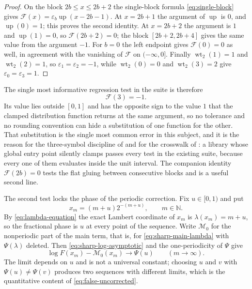 \documentclass[11pt,oneside]{article}
\theoremstyle{definition}
\theoremstyle{remark}
\newcommand{\N}{\mathbb N}
\newcommand{\Up}{\operatorname{up}}
\newcommand{\wt}{\operatorname{wt}_2}
\begin{document}
\begin{proof}
On the block $2b\le x\le2b+2$ the single-block formula \eqref{eq:single-block} gives
$\mathcal F(x)=\varepsilon_{b}\Up(x-2b-1)$.  At $x=2b+1$ the argument of $\Up$ is $0$, and
$\Up(0)=1$; this proves the second identity.  At $x=2b+2$ the argument is $1$ and
$\Up(1)=0$, so $\mathcal F(2b+2)=0$; the block $[2b+2,2b+4]$ gives the same value from the
argument $-1$.  For $b=0$ the left endpoint gives $\mathcal F(0)=0$ as well, in agreement
with the vanishing of $\mathcal F$ on $(-\infty,0]$.  Finally $\wt(1)=1$ and $\wt(2)=1$, so
$\varepsilon_{1}=\varepsilon_{2}=-1$, while $\wt(0)=0$ and $\wt(3)=2$ give
$\varepsilon_{0}=\varepsilon_{3}=1$.
\end{proof}

The single most informative regression test in the suite is therefore
\begin{equation}
 \mathcal F(3)=-1.                                        \label{eq:aud-test-global}
\end{equation}
Its value lies outside $[0,1]$ and has the opposite sign to the value $1$ that the clamped
distribution function returns at the same argument, so no tolerance and no rounding
convention can hide a substitution of one function for the other.  That substitution is the
single most common error in this subject, and it is the reason for the three-symbol
discipline of  and for the crosswalk of : a
library whose global entry point silently clamps passes every test in the existing suite,
because every one of them evaluates inside the unit interval.  The companion identity
$\mathcal F(2b)=0$ tests the flat gluing between consecutive blocks and is a useful second
line.

The second test locks the phase of the periodic correction.  Fix $u\in[0,1)$ and put
\begin{equation}
 x_{m}=(m+u)2^{-(m+u)},\qquad m\in\N.                     \label{eq:aud-phase-sequence}
\end{equation}
By \eqref{eq:lambda-equation} the exact Lambert coordinate of $x_{m}$ is
$\lambda(x_{m})=m+u$, so the fractional phase is $u$ at every point of the sequence.  Write
$\mathcal M_{0}$ for the nonperiodic part of the main term, that is, for
\eqref{eq:sharp-main-lambda} with $\Psi(\lambda)$ deleted.  Then
\eqref{eq:sharp-log-asymptotic} and the one-periodicity of $\Psi$ give
\begin{equation}
 \log F(x_{m})-\mathcal M_{0}(x_{m})\longrightarrow\Psi(u)
 \qquad(m\to\infty).                                      \label{eq:aud-phase-limit}
\end{equation}
The limit depends on $u$ and is not a universal constant; choosing $u$ and $v$ with
$\Psi(u)\ne\Psi(v)$ produces two sequences with different limits, which is the quantitative
content of \eqref{eq:false-uncorrected}.
\end{document}
